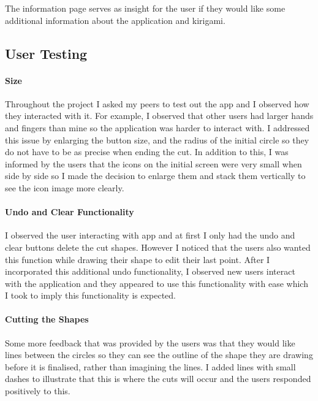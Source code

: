 \documentclass[11pt]{article}
\begin{document}
                    The information page serves as insight for the user if they would like some additional information about the application and kirigami.
               
               \subsection{User Testing}
    
           \paragraph{Size}
           Throughout the project I asked my peers to test out the app and I observed how they interacted with it. For example, I observed that other users had larger hands and fingers than mine so the application was harder to interact with. I addressed this issue by enlarging the button size, and the radius of the initial circle so they do not have to be as precise when ending the cut. In addition to this, I was informed by the users that the icons on the initial screen were very small when side by side so I made the decision to enlarge them and stack them vertically to see the icon image more clearly. 
           
           \paragraph{Undo and Clear Functionality}
           I observed the user interacting with app and at first I only had the undo and clear buttons delete the cut shapes. However I noticed that the users also wanted this function while drawing their shape to edit their last point. After I incorporated this additional undo functionality, I observed new users interact with the application and they appeared to use this functionality with ease which I took to imply this functionality is expected. 
           
           \paragraph{Cutting the Shapes}
           Some more feedback that was provided by the users was that they would like lines between the circles so they can see the outline of the shape they are drawing before it is finalised, rather than imagining the lines. I added lines with small dashes to illustrate that this is where the cuts will occur and the users responded positively to this. 
           
\end{document}
